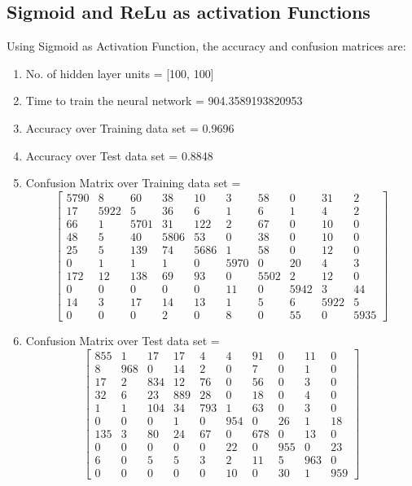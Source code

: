 \documentclass[11pt]{article}
\begin{document}
\subsection{Sigmoid and ReLu as activation Functions}
Using Sigmoid as Activation Function, the accuracy and confusion matrices are:
\begin{enumerate}
\item No. of hidden layer units = [100, 100]
\item Time to train the neural network = 904.3589193820953
\item Accuracy over Training data set = 0.9696
\item Accuracy over Test data set = 0.8848
\item Confusion Matrix over Training data set = 
\begin{equation}
  \begin{bmatrix}
5790 & 8 & 60 & 38 & 10 & 3 & 58 & 0 & 31 & 2\\
17 & 5922 & 5 & 36 & 6 & 1 & 6 & 1 & 4 & 2\\
66 & 1 & 5701 & 31 & 122 & 2 & 67 & 0 & 10 & 0\\
48 & 5 & 40 & 5806 & 53 & 0 & 38 & 0 & 10 & 0\\
25 & 5 & 139 & 74 & 5686 & 1 & 58 & 0 & 12 & 0\\
0 & 1 & 1 & 1 & 0 & 5970 & 0 & 20 & 4 & 3\\
172 & 12 & 138 & 69 & 93 & 0 & 5502 & 2 & 12 & 0\\
0 & 0 & 0 & 0 & 0 & 11 & 0 & 5942 & 3 & 44\\
14 & 3 & 17 & 14 & 13 & 1 & 5 & 6 & 5922 & 5\\
0 & 0 & 0 & 2 & 0 & 8 & 0 & 55 & 0 & 5935
  \end{bmatrix}
\end{equation}
\item Confusion Matrix over Test data set = 
\begin{equation}
  \begin{bmatrix}
855 & 1 & 17 & 17 & 4 & 4 & 91 & 0 & 11 & 0\\
8 & 968 & 0 & 14 & 2 & 0 & 7 & 0 & 1 & 0\\
17 & 2 & 834 & 12 & 76 & 0 & 56 & 0 & 3 & 0\\
32 & 6 & 23 & 889 & 28 & 0 & 18 & 0 & 4 & 0\\
1 & 1 & 104 & 34 & 793 & 1 & 63 & 0 & 3 & 0\\
0 & 0 & 0 & 1 & 0 & 954 & 0 & 26 & 1 & 18\\
135 & 3 & 80 & 24 & 67 & 0 & 678 & 0 & 13 & 0\\
0 & 0 & 0 & 0 & 0 & 22 & 0 & 955 & 0 & 23\\
6 & 0 & 5 & 5 & 3 & 2 & 11 & 5 & 963 & 0\\
0 & 0 & 0 & 0 & 0 & 10 & 0 & 30 & 1 & 959
  \end{bmatrix}
\end{equation}
\end{enumerate}
\end{document}
